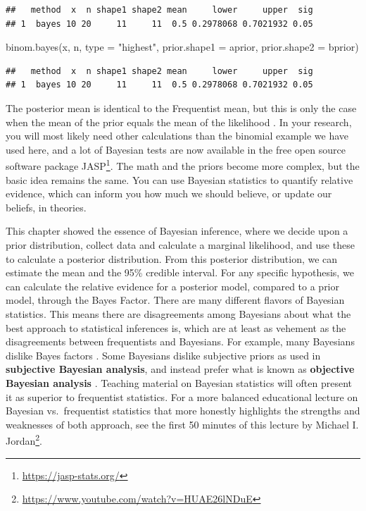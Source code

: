 \documentclass[
  oneside]{krantz}
\makeatletter
\newenvironment{Shaded}{\begin{snugshade}}{\end{snugshade}}
\newcommand{\AttributeTok}[1]{\textcolor[rgb]{0.61,0.61,0.61}{#1}}
\newcommand{\FunctionTok}[1]{\textcolor[rgb]{0,0,0}{#1}}
\newcommand{\NormalTok}[1]{#1}
\newcommand{\StringTok}[1]{\textcolor[rgb]{0.5,0.5,0.5}{#1}}
\renewcommand{\href}[2]{#2\footnote{\url{#1}}}
\newenvironment{kframe}{%
\medskip{}
\setlength{\fboxsep}{.8em}
 \def\at@end@of@kframe{}%
 \ifinner\ifhmode%
  \def\at@end@of@kframe{\end{minipage}}%
  \begin{minipage}{\columnwidth}%
 \fi\fi%
 \def\FrameCommand##1{\hskip\@totalleftmargin \hskip-\fboxsep
 \colorbox{shadecolor}{##1}\hskip-\fboxsep
     \hskip-\linewidth \hskip-\@totalleftmargin \hskip\columnwidth}%
 \MakeFramed {\advance\hsize-\width
   \@totalleftmargin\z@ \linewidth\hsize
   \@setminipage}}%
 {\par\unskip\endMakeFramed%
 \at@end@of@kframe}
\renewenvironment{Shaded}{\begin{kframe}}{\end{kframe}}
\makeatother
\begin{document}
\begin{verbatim}
##   method  x  n shape1 shape2 mean     lower     upper  sig
## 1  bayes 10 20     11     11  0.5 0.2978068 0.7021932 0.05
\end{verbatim}

\begin{Shaded}
\begin{Highlighting}[]
\FunctionTok{binom.bayes}\NormalTok{(x, n, }\AttributeTok{type =} \StringTok{"highest"}\NormalTok{, }\AttributeTok{prior.shape1 =}\NormalTok{ aprior, }\AttributeTok{prior.shape2 =}\NormalTok{ bprior)}
\end{Highlighting}
\end{Shaded}

\begin{verbatim}
##   method  x  n shape1 shape2 mean     lower     upper  sig
## 1  bayes 10 20     11     11  0.5 0.2978068 0.7021932 0.05
\end{verbatim}

The posterior mean is identical to the Frequentist mean, but this is only the case when the mean of the prior equals the mean of the likelihood \citep{albers_credible_2018}. In your research, you will most likely need other calculations than the binomial example we have used here, and a lot of Bayesian tests are now available in the free open source software package \href{https://jasp-stats.org/}{JASP}. The math and the priors become more complex, but the basic idea remains the same. You can use Bayesian statistics to quantify relative evidence, which can inform you how much we should believe, or update our beliefs, in theories.

This chapter showed the essence of Bayesian inference, where we decide upon a prior distribution, collect data and calculate a marginal likelihood, and use these to calculate a posterior distribution. From this posterior distribution, we can estimate the mean and the 95\% credible interval. For any specific hypothesis, we can calculate the relative evidence for a posterior model, compared to a prior model, through the Bayes Factor. There are many different flavors of Bayesian statistics. This means there are disagreements among Bayesians about what the best approach to statistical inferences is, which are at least as vehement as the disagreements between frequentists and Bayesians. For example, many Bayesians dislike Bayes factors \citep{mcelreath_statistical_2016}. Some Bayesians dislike subjective priors as used in \textbf{subjective Bayesian analysis}, and instead prefer what is known as \textbf{objective Bayesian analysis} \citep{berger_interplay_2004}. Teaching material on Bayesian statistics will often present it as superior to frequentist statistics. For a more balanced educational lecture on Bayesian vs.~frequentist statistics that more honestly highlights the strengths and weaknesses of both approach, see the first 50 minutes of \href{https://www.youtube.com/watch?v=HUAE26lNDuE}{this lecture by Michael I. Jordan}.
\end{document}
